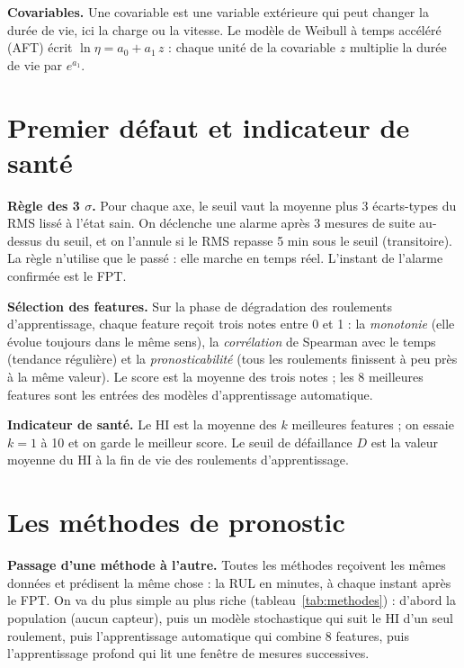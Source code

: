 \textbf{Covariables.} Une covariable est une variable extérieure qui peut changer la durée de vie, ici la charge ou la vitesse. Le modèle de Weibull à temps accéléré (AFT) \cite{kalbfleisch2002} écrit $\ln \eta = a_0 + a_1\,z$ : chaque unité de la covariable $z$ multiplie la durée de vie par $e^{a_1}$.

\section{Premier défaut et indicateur de santé}

\textbf{Règle des 3 $\sigma$.} Pour chaque axe, le seuil vaut la moyenne plus 3 écarts-types du RMS lissé à l'état sain. On déclenche une alarme après 3 mesures de suite au-dessus du seuil, et on l'annule si le RMS repasse 5 min sous le seuil (transitoire). La règle n'utilise que le passé : elle marche en temps réel. L'instant de l'alarme confirmée est le FPT.

\textbf{Sélection des features.} Sur la phase de dégradation des roulements d'apprentissage, chaque feature reçoit trois notes entre 0 et 1 \cite{coble2009} : la \emph{monotonie} (elle évolue toujours dans le même sens), la \emph{corrélation} de Spearman avec le temps (tendance régulière) et la \emph{pronosticabilité} (tous les roulements finissent à peu près à la même valeur). Le score est la moyenne des trois notes ; les 8 meilleures features sont les entrées des modèles d'apprentissage automatique.

\textbf{Indicateur de santé.} Le HI est la moyenne des $k$ meilleures features ; on essaie $k = 1$ à 10 et on garde le meilleur score. Le seuil de défaillance $D$ est la valeur moyenne du HI à la fin de vie des roulements d'apprentissage.

\section{Les méthodes de pronostic}

\textbf{Passage d'une méthode à l'autre.} Toutes les méthodes reçoivent les mêmes données et prédisent la même chose : la RUL en minutes, à chaque instant après le FPT. On va du plus simple au plus riche (tableau~\ref{tab:methodes}) : d'abord la population (aucun capteur), puis un modèle stochastique qui suit le HI d'un seul roulement, puis l'apprentissage automatique qui combine 8 features, puis l'apprentissage profond qui lit une fenêtre de mesures successives.

